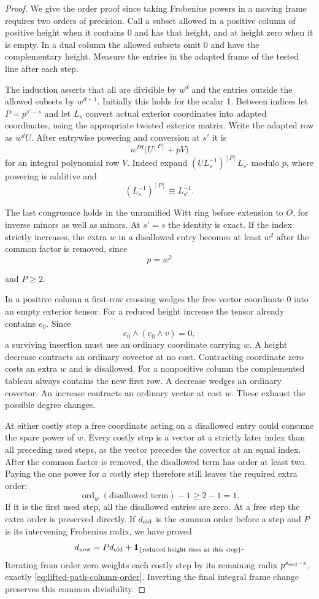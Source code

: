 \begin{proof}
We give the order proof since taking Frobenius powers in a
moving frame requires two orders of precision. Call a subset
allowed in a positive column of positive height when it contains
0 and has that height, and at height zero when it is empty.
In a dual column the allowed subsets omit 0 and have the
complementary height. Measure the entries in the adapted frame
of the tested line after each step.

The induction asserts that
all are divisible by \(w^d\) and the entries outside the allowed
subsets by \(w^{d+1}\). Initially this holds for the scalar 1.
Between indices let \(P=p^{s'-s}\) and let \(L_s\) convert actual
exterior coordinates into adapted coordinates, using the
appropriate twisted exterior matrix. Write the adapted row as
\(w^d U\). After entrywise powering and conversion at \(s'\) it is
\[
         w^{Pd}\big(U^{[P]}+pV\big)
\]
for an integral polynomial row \(V\). Indeed expand
\((U L_s^{-1})^{[P]} L_{s'}\) modulo \(p\), where powering is
additive and
\[
 (L_s^{-1})^{[P]}\equiv L_{s'}^{-1}.
\]

The last congruence holds in the unramified Witt ring before
extension to \(O\), for inverse minors as well as minors.
At \(s'=s\) the identity is exact. If the index strictly
increases, the extra \(w\) in a disallowed entry becomes at least
\(w^2\) after the common factor is removed, since
\[
 p=w^2
\]

and \(P\ge2\).

In a positive column a first-row crossing wedges the free
vector coordinate 0 into an empty exterior tensor. For a reduced height increase the tensor already contains \(e_0\). Since
\[
 e_0\wedge(e_0\wedge v)=0,
\]
a surviving insertion must use an ordinary coordinate carrying \(w\).
A height decrease contracts an ordinary covector at no cost.
Contracting coordinate zero costs an extra \(w\) and is disallowed.
For a nonpositive column the complemented tableau always contains
the new first row. A decrease wedges an ordinary covector. An
increase contracts an ordinary vector at cost \(w\). These exhaust
the possible degree changes.

At either costly step a free coordinate acting on a disallowed entry could consume the spare power of \(w\). Every costly step is a vector
at a strictly later index than all preceding used steps, as the
vector precedes the covector at an equal index. After the common factor is removed, the disallowed term has order at least two. Paying the one power for a costly step therefore still leaves the required extra order:
\[
 \operatorname{ord}_w(\text{disallowed term})-1\ge2-1=1 .
\] If it is the first used step,
all the disallowed entries are zero. At a free step the extra
order is preserved directly. If \(d_{\rm old}\) is the common order before a step and
\(P\) is its intervening Frobenius radix, we have proved
\[
 d_{\rm new}=P d_{\rm old}+
       \mathbf1_{\{\text{reduced height rises at this step}\}} .
\]
Iterating from order zero weights each costly step by its
remaining radix \(p^{s_{\rm end}-s}\), exactly
\eqref{eq:lifted-path-column-order}. Inverting the final
integral frame change preserves this common divisibility.


\end{proof}
